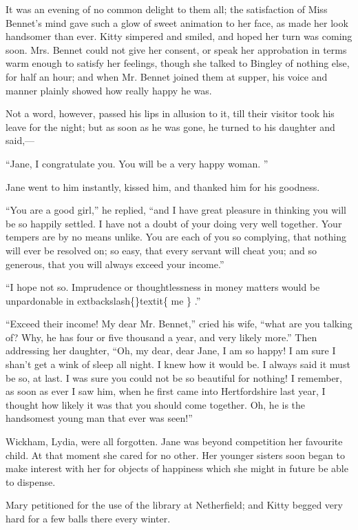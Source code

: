 \documentclass[10pt]{book}
\begin{document}
   It was an evening of no common delight to them all; the satisfaction of
Miss Bennet’s mind gave such a glow of sweet animation to her face, as
made her look handsomer than ever. Kitty simpered and smiled, and hoped
her turn was coming soon. Mrs. Bennet could not give her consent, or
speak her approbation in terms warm enough to satisfy her feelings,
though she talked to Bingley of nothing else, for half an hour; and when
Mr. Bennet joined them at supper, his voice and manner plainly showed
how really happy he was.
  

   Not a word, however, passed his lips in allusion to it, till their
visitor took his leave for the night; but as soon as he was gone, he
turned to his daughter and said,—
  

   “Jane, I congratulate you. You will be a very happy woman.
   ”
  

   Jane went to him instantly, kissed him, and thanked him for his
goodness.
  

   “You are a good girl,” he replied, “and I have great pleasure in
thinking you will be so happily settled. I have not a doubt of your
doing very well together. Your tempers are by no means unlike. You are
each of you so complying, that nothing will ever be resolved on; so
easy, that every servant will cheat you; and so generous, that you will
always exceed your income.”
  

   “I hope not so. Imprudence or thoughtlessness in money matters would be
unpardonable in
   	extbackslash\{\}textit\{
    me
   \}
   .”
  

   “Exceed their income! My dear Mr. Bennet,” cried his wife, “what are you
talking of? Why, he has four or five thousand a year, and very likely
more.” Then addressing her daughter, “Oh, my dear, dear Jane, I am so
happy! I am sure I shan’t get a wink of sleep all night. I knew how it
would be. I always said it must be so, at last. I was sure you could not
be so beautiful for nothing! I remember, as soon as ever I saw him, when
he first came into Hertfordshire last year, I thought how likely it was
that you should come together. Oh, he is the handsomest young man that
ever was seen!”
  

   Wickham, Lydia, were all forgotten. Jane was beyond competition her
favourite child. At that moment she cared for no other. Her younger
sisters soon began to make interest with her for objects of happiness
which she might in future be able to dispense.
  

   Mary petitioned for the use of the library at Netherfield; and Kitty
begged very hard for a few balls there every winter.
  
\end{document}
